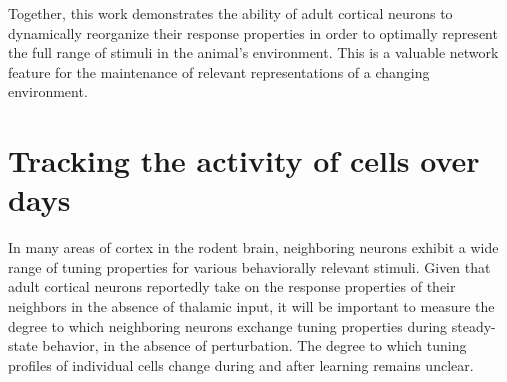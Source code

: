 \bigskip

Together, this work demonstrates the ability of adult cortical neurons to dynamically reorganize their response properties in order to optimally represent the full range of stimuli in the animal's environment. This is a valuable network feature for the maintenance of relevant representations of a changing environment.

\section{Tracking the activity of cells over days}

In many areas of cortex in the rodent brain, neighboring neurons exhibit a wide range of tuning properties for various behaviorally relevant stimuli. Given that adult cortical neurons reportedly take on the response properties of their neighbors in the absence of thalamic input, it will be important to measure the degree to which neighboring neurons exchange tuning properties during steady-state behavior, in the absence of perturbation. The degree to which tuning profiles of individual cells change during and after learning remains unclear.

\bigskip


